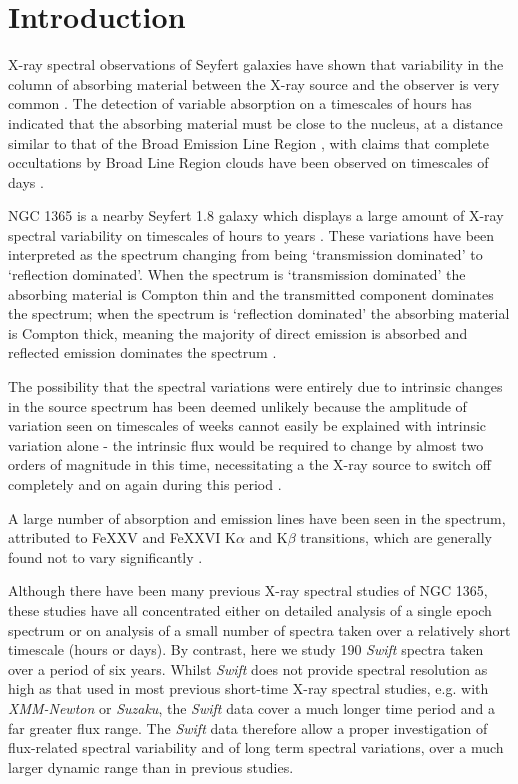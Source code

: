 \documentclass[useAMS,usenatbib]{sam}
\begin{document}
\section{Introduction}

X-ray spectral observations of Seyfert galaxies have shown that variability in the column of absorbing material between the X-ray source and the observer is very
common \citep{risaliti02}. The detection of variable absorption on a timescales of hours has indicated that the absorbing material must be close to the nucleus, at a
distance similar to that of the Broad Emission Line Region   \citep[e.g.][]{lamer,elvis04,puccetti}, with claims that complete occultations by Broad
Line
Region clouds have been observed on timescales of days \citep{risaliti07a}.


NGC 1365 is a nearby Seyfert 1.8 galaxy \citep{maiolino95} which displays a large amount of X-ray spectral variability \citep{risaliti09} on timescales of hours
to years \citep{brenneman}. These variations have been interpreted as the spectrum changing from being `transmission dominated' to `reflection
dominated'. When the spectrum is `transmission dominated' \citep[e.g.][]{risaliti00} the absorbing material is Compton thin and the transmitted component dominates
the
spectrum; when the spectrum is `reflection dominated'  \citep[e.g.][]{iyomoyo} the absorbing material is Compton thick, meaning the majority of direct emission is
absorbed
and reflected emission dominates the spectrum \citep{risaliti07b,matt}. 

The possibility that the spectral variations were entirely due to intrinsic changes in the source spectrum has been deemed unlikely because the amplitude of variation
seen on timescales of weeks cannot easily be explained with intrinsic variation alone - the intrinsic flux would be required to change by almost two orders of magnitude
in this time, necessitating a the X-ray source to switch off completely and on again during this period \citep{risaliti07b,risaliti05b}. 

A large number of absorption and emission lines have been seen in the spectrum, attributed to FeXXV and FeXXVI K$\alpha$ and K$\beta$ transitions, which are generally
found not to vary significantly \citep{risaliti05b}.

Although there have been many previous X-ray spectral studies of NGC 1365, these studies have all concentrated either on detailed analysis of a single epoch spectrum or
on analysis of a small number of spectra taken over a relatively short timescale (hours or days). By contrast, here we study 190 {\it Swift} spectra taken over a period
of six
years. Whilst {\it Swift} does not provide spectral resolution as high as that used in most previous short-time X-ray spectral studies, e.g. with {\it XMM-Newton} or {\it
Suzaku}, the {\it Swift} data cover a much longer time period and a far greater flux range. The {\it Swift} data therefore allow a proper investigation of flux-related
spectral variability and of long term spectral variations, over a much larger dynamic range than in previous studies.
\end{document}
